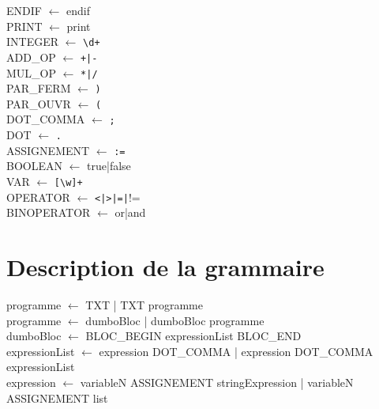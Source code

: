 ﻿\documentclass{report}
\begin{document}
ENDIF $\leftarrow$ endif\\

PRINT $\leftarrow$ print\\

INTEGER $\leftarrow$ \verb!\d+!\\

ADD\_OP $\leftarrow$ \verb!+|-!\\

MUL\_OP $\leftarrow$ \verb!*|/!\\

PAR\_FERM $\leftarrow$ \verb!)!\\

PAR\_OUVR $\leftarrow$ \verb!(!\\

DOT\_COMMA $\leftarrow$ \verb!;!\\

DOT $\leftarrow$ \verb!.!\\

ASSIGNEMENT $\leftarrow$ \verb!:=!\\

BOOLEAN $\leftarrow$ true|false\\

VAR $\leftarrow$ \verb![\w]+!\\

OPERATOR $\leftarrow$ \verb!<|>|=|!!=\\

BINOPERATOR $\leftarrow$ or|and\\



\section*{ Description de la grammaire}

programme $\leftarrow$ TXT | TXT programme\\

programme $\leftarrow$ dumboBloc | dumboBloc programme\\

dumboBloc $\leftarrow$ BLOC\_BEGIN expressionList BLOC\_END\\

expressionList $\leftarrow$ expression DOT\_COMMA | expression DOT\_COMMA expressionList\\

expression $\leftarrow$ variableN ASSIGNEMENT stringExpression | variableN ASSIGNEMENT list\\
\end{document}
